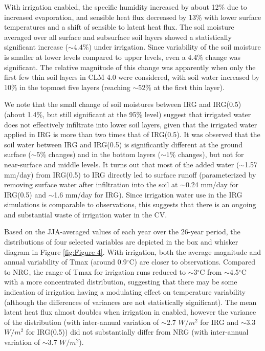 \documentclass[draft,ms]{agutex}   %
\begin{document}
\begin{article}
With irrigation enabled, the specific humidity increased by about 12$\%$ due to increased evaporation, and sensible heat flux decreased by 13\% with lower surface temperatures and a shift of sensible to latent heat flux. The soil moisture averaged over all surface and subsurface soil layers showed a statistically significant increase ($\sim4.4\%$) under irrigation. Since variability of the soil moisture is smaller at lower levels compared to upper levels, even a 4.4$\%$ change was significant.  The relative magnitude of this change was apparently when only the first few thin soil layers in CLM 4.0 were considered, with soil water increased by 10$\%$ in the topmost five layers (reaching $\sim52\%$ at the first thin layer).

We note that the small change of soil moistures between IRG and IRG(0.5) (about 1.4$\%$, but still significant at the 95\% level) suggest that irrigated water does not effectively infiltrate into lower soil layers, given that the irrigated water applied in IRG is more than two times that of IRG(0.5). It was observed that the soil water between IRG and IRG(0.5) is significantly different at the ground surface ($\sim5\%$ changes) and in the bottom layers ($\sim1\%$ changes), but not for near-surface and middle levels. It turns out that most of the added water ($\sim$1.57 mm/day) from IRG(0.5) to IRG directly led to surface runoff (parameterized by removing surface water after infiltration into the soil at $\sim$0.24 mm/day for IRG(0.5) and $\sim$1.6 mm/day for IRG). Since irrigation water use in the IRG simulations is comparable to observations, this suggests that there is an ongoing and substantial waste of irrigation water in the CV.

Based on the JJA-averaged values of each year over the 26-year period, the distributions of four selected variables are depicted in the box and whisker diagram in Figure \ref{fig:Figure 4}. With irrigation, both the average magnitude and annual variability of Tmax (around 0.9$^\circ$C) are closer to observations. Compared to NRG, the range of Tmax for irrigation runs reduced to $\sim$3$^\circ$C from $\sim$4.5$^\circ$C with a more concentrated distribution, suggesting that there may be some indication of irrigation having a modulating effect on temperature variability (although the differences of variances are not statistically significant). The mean latent heat flux almost doubles when irrigation in enabled, however the variance of the distribution (with inter-annual variation of $\sim$2.7 $W/m^2$ for IRG and $\sim$3.3 $W/m^2$ for IRG(0.5)) did not substantially differ from NRG (with inter-annual variation of $\sim$3.7 $W/m^2$). 


\end{article}
\end{document}
